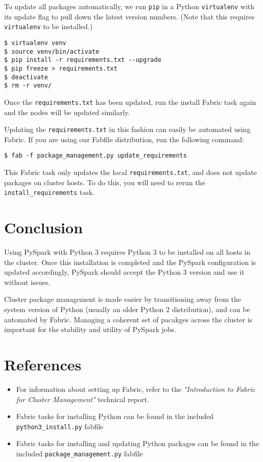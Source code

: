 \documentclass[9pt,twocolumn,twoside]{idsi}
\begin{document}
To update all packages automatically, we run \texttt{pip} in a Python \texttt{virtualenv} with its update flag to pull down the latest version numbers. (Note that this requires \texttt{virtualenv} to be installed.)

\begin{verbatim}
$ virtualenv venv
$ source venv/bin/activate
$ pip install -r requirements.txt --upgrade
$ pip freeze > requirements.txt
$ deactivate
$ rm -r venv/
\end{verbatim}

Once the \texttt{requirements.txt} has been updated, run the install Fabric task again and the nodes will be updated similarly.

Updating the \texttt{requirements.txt} in this fashion can easily be automated using Fabric. If you are using our Fabfile distribution, run the following command:
\begin{verbatim}
$ fab -f package_management.py update_requirements
\end{verbatim}

This Fabric task only updates the local \texttt{requirements.txt}, and does not update packages on cluster hosts. To do this, you will need to rerun the \texttt{install\_requirements} task.

\section{Conclusion}
Using PySpark with Python 3 requires Python 3 to be installed on all hosts in the cluster. Once this installation is completed and the PySpark configuration is updated accordingly, PySpark should accept the Python 3 version and use it without issues.

Cluster package management is made easier by transitioning away from the system version of Python (usually an older Python 2 distribution), and can be automated by Fabric. Managing a coherent set of pacakges across the cluster is important for the stability and utility of PySpark jobs.

\section*{References}
\begin{itemize}
  \item For information about setting up Fabric, refer to the \emph{"Introduction to Fabric for Cluster Management"} technical report.
  \item Fabric tasks for installing Python can be found in the included \texttt{python3\_install.py} fabfile
  \item Fabric tasks for installing and updating Python packages can be found in the included \texttt{package\_management.py} fabfile
\end{itemize}
\end{document}
